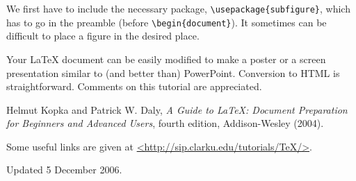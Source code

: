 \documentclass[prb,12pt]{revtex4}
\begin{document}
We first have to include the necessary package,
\verb+\usepackage{subfigure}+, which has to go in the preamble (before
\verb+\begin{document}+). It sometimes can be difficult to place a figure in
the desired place.

Your LaTeX document can be easily modified to make a poster or a screen
presentation similar to (and better than) PowerPoint. Conversion to HTML is
straightforward. Comments on this tutorial are appreciated.

\begin{thebibliography}{5}

Helmut Kopka and Patrick W. Daly, \textsl{A Guide to
\LaTeX: Document Preparation for Beginners and Advanced Users},
fourth edition, Addison-Wesley (2004).

Some useful links are
given at \url{<http://sip.clarku.edu/tutorials/TeX/>}.

\end{thebibliography}

{\small \smallskip\noindent Updated 5 December 2006.}
\end{document}
